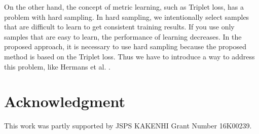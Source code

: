 \documentclass[conference]{IEEEtran}
\begin{document}
On the other hand, the concept of metric learning, such as Triplet loss, has a problem with hard sampling.
In hard sampling, we intentionally select samples that are difficult to learn to get consistent training results.
If you use only samples that are easy to learn, the performance of learning decreases.
In the proposed approach, it is necessary to use hard sampling because the proposed method is based on the Triplet loss.
Thus we have to introduce a way to address this problem, like Hermans et al. \cite{Hermans2017}.


\section*{Acknowledgment}

This work was partly supported by JSPS KAKENHI Grant Number 16K00239.




\end{document}
